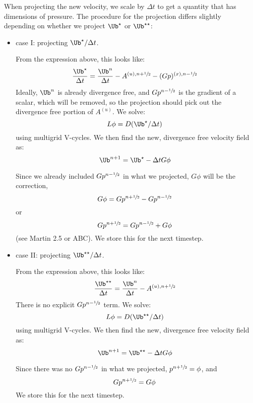 When projecting the new velocity, we scale by $\Delta t$ to get a quantity
that has dimensions of pressure.  The procedure for the projection
differs slightly depending on whether we project $\Ub^\star$ or $\Ub^{\star\star}$:
\begin{itemize}
\item case I: projecting $\Ub^{\star}/\Delta t$.

From the expression above,
this looks like:
\begin{equation}
\frac{\Ub^\star}{\Delta t} = \frac{\Ub^n}{\Delta t} - A^{(u),n+\myhalf} - (G p)^{(x),n-\myhalf}
\end{equation}
Ideally, $\Ub^n$ is already divergence free, and $Gp^{n-{\sfrac{1}{2}}}$ is the
gradient of a scalar, which will be removed, so the projection should
pick out the divergence free portion of $A^{(u)}$.  We solve:
\begin{equation}
L\phi = D (\Ub^\star/\Delta t)
\end{equation}
using multigrid V-cycles.
We then find the new, divergence free velocity field as:
\begin{equation}
\Ub^{n+1} = \Ub^\star - \Delta t G\phi
\end{equation}

Since we already included $Gp^{n-{\sfrac{1}{2}}}$ in what we projected, $G\phi$
will be the correction,
\begin{equation}
G\phi = Gp^{n+{\sfrac{1}{2}}} - Gp^{n-{\sfrac{1}{2}}}
\end{equation}
or
\begin{equation}
Gp^{n+{\sfrac{1}{2}}} = Gp^{n-{\sfrac{1}{2}}} + G\phi
\end{equation}
(see Martin 2.5 or ABC).  We store this for the next timestep.


\item case II: projecting $\Ub^{\star\star}/\Delta t$.

From the expression above,
this looks like:
\begin{equation}
\frac{\Ub^{\star\star}}{\Delta t} = \frac{\Ub^n}{\Delta t} - A^{(u),n+\myhalf}
\end{equation}
There is no explicit $Gp^{n-{\sfrac{1}{2}}}$ term.  We solve:
\begin{equation}
L\phi = D (\Ub^{\star\star}/\Delta t)
\end{equation}
using multigrid V-cycles.
We then find the new, divergence free velocity field as:
\begin{equation}
\Ub^{n+1} = \Ub^{\star\star} - \Delta t G\phi
\end{equation}

Since there was no $Gp^{n-{\sfrac{1}{2}}}$ in what we projected, $p^{n+{\sfrac{1}{2}}} = \phi$,
and
\begin{equation}
Gp^{n+{\sfrac{1}{2}}} = G\phi
\end{equation}
We store this for the next timestep.
\end{itemize}

